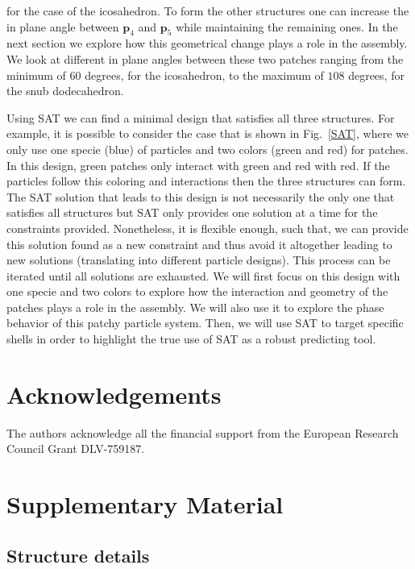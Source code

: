 \documentclass[a4paper, amsfonts, amssymb, amsmath, reprint, showkeys, nofootinbib, oneside]{revtex4-1}
\begin{document}
\noindent for the case of the icosahedron. To form the other structures one can increase the in plane angle between $\textbf{p}_4$ and $\textbf{p}_5$ while maintaining the remaining ones. In the next section we explore how this geometrical change plays a role in the assembly. We look at different in plane angles between these two patches ranging from the minimum of $60$ degrees, for the icosahedron, to the maximum of $108$ degrees, for the snub dodecahedron.

Using SAT we can find a minimal design that satisfies all three structures. For example, it is possible to consider the case that is shown in Fig.~\ref{SAT}, where we only use one specie (blue) of particles and two colors (green and red) for patches. In this design, green patches only interact with green and red with red. If the particles follow this coloring and interactions then the three structures can form. The SAT solution that leads to this design is not necessarily the only one that satisfies all structures but SAT only provides one solution at a time for the constraints provided. Nonetheless, it is flexible enough, such that, we can provide this solution found as a new constraint and thus avoid it altogether leading to new solutions (translating into different particle designs). This process can be iterated until all solutions are exhausted. We will first focus on this design with one specie and two colors to explore how the interaction and geometry of the patches plays a role in the assembly. We will also use it to explore the phase behavior of this patchy particle system. Then, we will use SAT to target specific shells in order to highlight the true use of SAT as a robust predicting tool.

\section{Acknowledgements}

The authors acknowledge all the financial support from the European Research Council Grant DLV-759187.



\section{Supplementary Material}

\subsection{Structure details}
\end{document}
